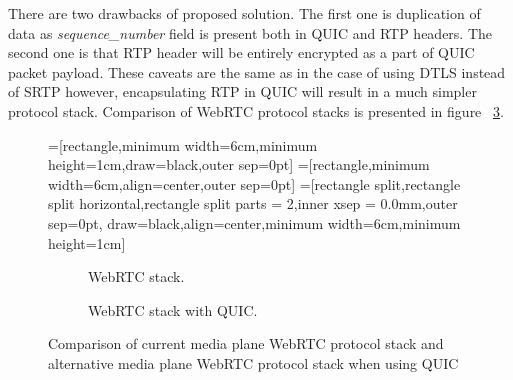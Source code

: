 There are two drawbacks of proposed solution.
The first one is duplication of data as \textit{sequence\_number} field is present both in QUIC and RTP headers.
The second one is that RTP header will be entirely encrypted as a part of QUIC packet payload.
These caveats are the same as in the case of using DTLS instead of SRTP however, encapsulating RTP in QUIC
will result in a much simpler protocol stack.
Comparison of WebRTC protocol stacks is presented in figure ~\ref{fig:webrtc-stack-comparision}.

\begin{figure}[h]
    \centering
    =[rectangle,minimum width=6cm,minimum height=1cm,draw=black,outer sep=0pt]
    =[rectangle,minimum width=6cm,align=center,outer sep=0pt]
    =[rectangle split,rectangle split horizontal,rectangle split parts = 2,inner xsep = 0.0mm,outer sep=0pt,
    draw=black,align=center,minimum width=6cm,minimum height=1cm]
    \begin{subfigure}[b]{0.4\textwidth}
        \caption{WebRTC stack.}
        \label{fig:webrtc-stack-comparision-standard}
    \end{subfigure}
    \hfill
    \begin{subfigure}[b]{0.4\textwidth}
        \caption{WebRTC stack with QUIC.}
        \label{fig:webrtc-stack-comparision-quic}
    \end{subfigure}
    \caption{Comparison of current media plane WebRTC protocol stack and alternative media plane WebRTC protocol stack when using QUIC}
    \label{fig:webrtc-stack-comparision}
\end{figure}

